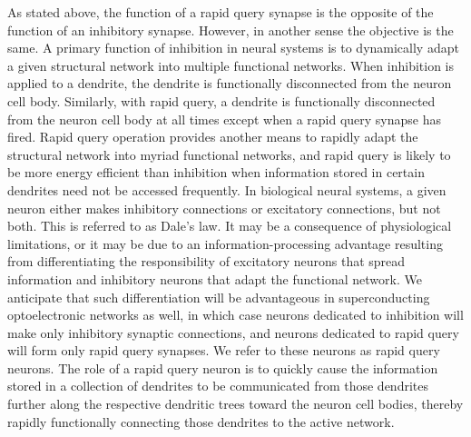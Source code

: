 \documentclass[twocolumn]{article}
\begin{document}
As stated above, the function of a rapid query synapse is the opposite of the function of an inhibitory synapse. However, in another sense the objective is the same. A primary function of inhibition in neural systems is to dynamically adapt a given structural network into multiple functional networks. When inhibition is applied to a dendrite, the dendrite is functionally disconnected from the neuron cell body. Similarly, with rapid query, a dendrite is functionally disconnected from the neuron cell body at all times except when a rapid query synapse has fired. Rapid query operation provides another means to rapidly adapt the structural network into myriad functional networks, and rapid query is likely to be more energy efficient than inhibition when information stored in certain dendrites need not be accessed frequently. In biological neural systems, a given neuron either makes inhibitory connections or excitatory connections, but not both. This is referred to as Dale's law. It may be a consequence of physiological limitations, or it may be due to an information-processing advantage resulting from differentiating the responsibility of excitatory neurons that spread information and inhibitory neurons that adapt the functional network. We anticipate that such differentiation will be advantageous in superconducting optoelectronic networks as well, in which case neurons dedicated to inhibition will make only inhibitory synaptic connections, and neurons dedicated to rapid query will form only rapid query synapses. We refer to these neurons as rapid query neurons. The role of a rapid query neuron is to quickly cause the information stored in a collection of dendrites to be communicated from those dendrites further along the respective dendritic trees toward the neuron cell bodies, thereby rapidly functionally connecting those dendrites to the active network.
\end{document}
